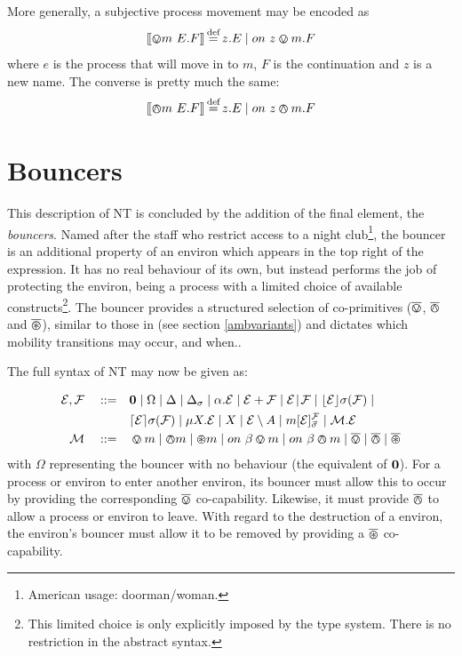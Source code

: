 More generally, a subjective process movement may be encoded as
\begin{equation}
[\hspace{-0.3ex}[ \varovee m\ {E}.F ]\hspace{-0.3ex}] \operatorname{\stackrel{\textrm{def}}{=}} z.E \;|\; on\ z \varovee m.F
\end{equation}
where $e$ is the process that will move in to $m$, $F$ is
the continuation and $z$ is a new name.  The converse is pretty much the same:
\begin{equation}
[\hspace{-0.3ex}[ \varowedge m\ {E}.F ]\hspace{-0.3ex}] \operatorname{\stackrel{\textrm{def}}{=}} z.E \;|\; on\ z \varowedge m.F
\end{equation}

\section{Bouncers}
\label{bouncers}

This description of NT is concluded by the addition of the final
element, the \emph{bouncers}.  Named after the staff who
restrict access to a night club\footnote{American usage:
doorman/woman.}, the bouncer is an additional property of an environ
which appears in the top right of the expression.  It has no real
behaviour of its own, but instead performs the job of protecting the
environ, being a process with a limited choice of available
constructs\footnote{This limited choice is only explicitly imposed by
the type system.  There is no restriction in the abstract syntax.}.  The
bouncer provides a structured selection of co-primitives ($\overline{\varovee}$,
$\overline{\varowedge}$ and $\overline{\varoast}$), similar to those in \cite{sangiorgi:mobsafeambients} (see section \ref{ambvariants}) and dictates which mobility transitions may
occur, and when..

The full syntax of NT may now be given as:

\begin{equation}
  \begin{aligned}
    \text{$\mathcal{E}$}, \text{$\mathcal{F}$} \quad \mathrel{::=} \quad &
      \textbf{0}  \mid
      \Omega \mid
      \Delta \mid
      \Delta_{\sigma} \mid
      \alpha . \text{$\mathcal{E}$}  \mid
      \text{$\mathcal{E}$} + \text{$\mathcal{F}$} \mid
      \text{$\mathcal{E}$} \mathrel{\!|\!} \text{$\mathcal{F}$} \mid
      \lfloor{\text{$\mathcal{E}$}}\rfloor {\sigma} ({\text{$\mathcal{F}$}}) \mid \\
    & \lceil{\text{$\mathcal{E}$}}\rceil {\sigma} ({\text{$\mathcal{F}$}}) \mid 
      \mu X . \text{$\mathcal{E}$} \mid
      X \mid 
      \text{$\mathcal{E}$} \setminus {A} \mid
      {m}[ \text{$\mathcal{E}$} ]^{\text{$\mathcal{F}$}}_{\vec{\sigma}} \mid
      \text{$\mathcal{M}$} . \text{$\mathcal{E}$} \\
   \text{$\mathcal{M}$} \quad \mathrel{::=} \quad & \varovee m \mid \varowedge m \mid \varoast m \mid
      on\ \beta \varovee m \mid on\ \beta \varowedge m \mid \overline{\varovee} \mid
      \overline{\varowedge} \mid \overline{\varoast}
   \end{aligned}
   \label{eqn:tnt-syntax}
\end{equation}
with $\Omega$ representing the bouncer with no behaviour (the
equivalent of $\textbf{0}$).  For a process or environ to enter another
environ, its bouncer must allow this to occur by providing the
corresponding $\overline{\varovee}$ co-capability.  Likewise, it must provide $\overline{\varowedge}$
to allow a process or environ to leave.  With regard to the destruction
of a environ, the environ's bouncer must allow it to be removed by
providing a $\overline{\varoast}$ co-capability.

